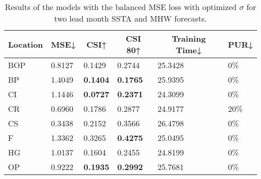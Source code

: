 \documentclass[11pt, a4paper]{article}
\begin{document}
\begin{table}[H]
\centering
\small
\caption{Results of the models with the balanced MSE loss with optimized $\sigma$ for two lead month SSTA and MHW forecasts.}
\begin{tabular}{llllll}
\multicolumn{1}{c}{\textbf{Location}} & \multicolumn{1}{c}{\textbf{MSE↓}} & \multicolumn{1}{c}{\textbf{CSI↑}} & \multicolumn{1}{c}{\textbf{CSI 80↑}} & \multicolumn{1}{c}{\textbf{Training Time↓}} & \multicolumn{1}{c}{\textbf{PUR↓}} \\ \hline
BOP                         & 0.8127                            & 0.1429                            & 0.2744                               & 25.3428                                     & 0\%                               \\
BP                        & 1.4049                            & \textbf{0.1404}                   & \textbf{0.1765}                      & 25.9395                                     & 0\%                               \\
CI                        & 1.1446                            & \textbf{0.0727}                   & \textbf{0.2371}                      & 24.3099                                     & 0\%                               \\
CR                           & 0.6960                            & 0.1786                            & 0.2877                               & 24.9177                                     & 20\%                              \\
CS                           & 0.3438                            & 0.2152                            & 0.3566                               & 26.4798                                     & 0\%                               \\
F                             & 1.3362                            & 0.3265                            & \textbf{0.4275}                      & 25.0495                                     & 0\%                               \\
HG                          & 1.0137                            & 0.1604                            & 0.2455                               & 24.8199                                     & 0\%                               \\
OP                       & 0.9222                            & \textbf{0.1935}                   & \textbf{0.2992}                      & 25.7681                                     & 0\%                               \\

\end{tabular}
\end{table}
\end{document}
